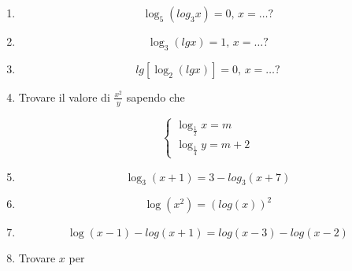 \begin{enumerate}
\item
\begin{equation*}
\log_5(log_3x)=0\textrm{, }x=\ldots?
\end{equation*}

\item
\begin{equation*}
\log_3(lg x)=1\textrm{, }x=\ldots?
\end{equation*}

\item
\begin{equation*}
lg[\log_2(lg x)]=0\textrm{, }x=\ldots?
\end{equation*}

\item

Trovare il valore di $\frac{x^2}{y}$ sapendo che 

\begin{equation*}
\left\{
\begin{array}{ll}
\log_\frac{1}{2} x=m\\
\log_{\frac{1}{4}}y=m+2
\end{array}
\right.
\end{equation*}


\item

\begin{equation*}
\log_3(x+1)=3-log_3(x+7)
\end{equation*}


\item

\begin{equation*}
\log(x^2)=(log(x))^2 
\end{equation*}



\item
\begin{equation*}
\log(x-1)-log(x+1)=log(x-3)-log(x-2)
\end{equation*}



\item Trovare $x$ per 


\end{enumerate}
